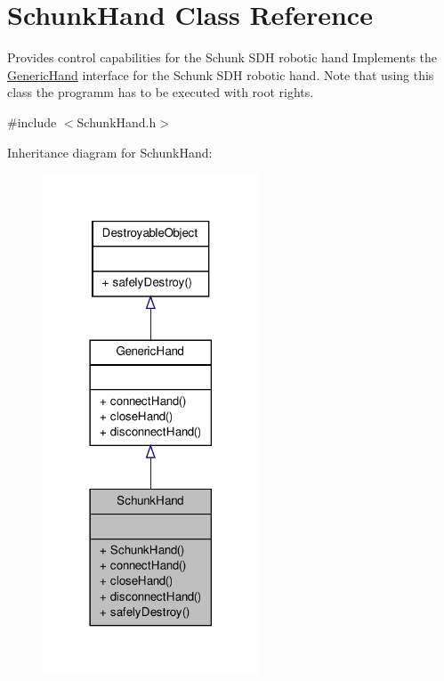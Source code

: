 \hypertarget{classSchunkHand}{\section{\-Schunk\-Hand \-Class \-Reference}
\label{classSchunkHand}
}


\-Provides control capabilities for the \-Schunk \-S\-D\-H robotic hand \-Implements the \hyperlink{classGenericHand}{\-Generic\-Hand} interface for the \-Schunk \-S\-D\-H robotic hand. \-Note that using this class the programm has to be executed with root rights.  




{\ttfamily \#include $<$\-Schunk\-Hand.\-h$>$}



\-Inheritance diagram for \-Schunk\-Hand\-:\nopagebreak
\begin{figure}[H]
\begin{center}
\leavevmode
\includegraphics[width=182pt]{classSchunkHand__inherit__graph}
\end{center}
\end{figure}


